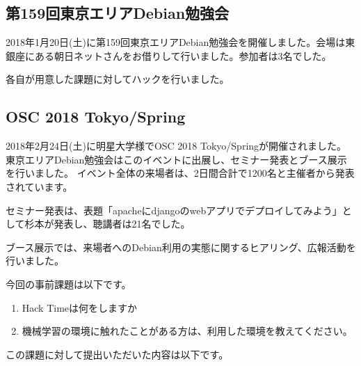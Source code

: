 \documentclass[mingoth,a4paper]{jsarticle}
\begin{document}

\subsection{第159回東京エリアDebian勉強会}

2018年1月20日(土)に第159回東京エリアDebian勉強会を開催しました。会場は東銀座にある朝日ネットさんをお借りして行いました。参加者は3名でした。

各自が用意した課題に対してハックを行いました。


\subsection{OSC 2018 Tokyo/Spring}

2018年2月24日(土)に明星大学様でOSC 2018 Tokyo/Springが開催されました。東京エリアDebian勉強会はこのイベントに出展し、セミナー発表とブース展示を行いました。
イベント全体の来場者は、2日間合計で1200名と主催者から発表されています。


セミナー発表は、表題「apacheにdjangoのwebアプリでデプロイしてみよう」として杉本が発表し、聴講者は21名でした。


ブース展示では、来場者へのDebian利用の実態に関するヒアリング、広報活動を行いました。



今回の事前課題は以下です。

\begin{enumerate}
\item Hack Timeは何をしますか
\item 機械学習の環境に触れたことがある方は、利用した環境を教えてください。
\end{enumerate}

この課題に対して提出いただいた内容は以下です。

\begin{multicols}{2}
{\small

}
\end{multicols}

%
%
%
%


\end{document}
